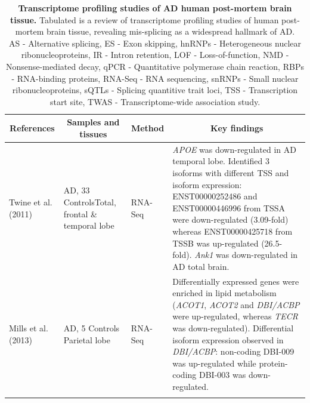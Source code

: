 \begin{landscape}
	\small %
	\setlength\tabcolsep{2pt} %
	\renewcommand{\arraystretch}{1}
	\begin{longtable}[c]{p{3cm}p{4cm}p{3cm}p{16cm}}
		\caption[Transcriptome profiling studies of AD human post-mortem brain tissue]%
		{\textbf{Transcriptome profiling studies of AD human post-mortem brain tissue.} Tabulated is a review of transcriptome profiling studies of human post-mortem brain tissue, revealing mis-splicing as a widespread hallmark of AD. \newline AS - Alternative splicing, ES - Exon skipping, hnRNPs - Heterogeneous nuclear ribonucleoproteins, IR - Intron retention, LOF - Loss-of-function, NMD - Nonsense-mediated decay, qPCR - Quantitative polymerase chain reaction, RBPs - RNA-binding proteins, RNA-Seq - RNA sequencing, snRNPs - Small nuclear ribonucleoproteins, sQTLs - Splicing quantitive trait loci, TSS - Transcription start site, TWAS - Transcriptome-wide association study.}
		\label{tab: AS_ADHuman_studies}\\
		
		\toprule
		\multicolumn{1}{c}{References} &
		\multicolumn{1}{c}{Samples and tissues} &
		\multicolumn{1}{c}{Method} &
		\multicolumn{1}{c}{Key findings} \\* \midrule
		\endfirsthead
		\endhead
		\bottomrule
		\endfoot
		\endlastfoot
		\centering Twine et al. (2011)\cite{Twine2011} &
		\centering 3 AD, 33 Controls\newline Total, frontal \& temporal lobe &
		\centering RNA-Seq &
		\tabitem \textit{APOE} was down-regulated in AD temporal lobe. Identified 3 isoforms with different TSS and isoform expression: ENST00000252486 and ENST00000446996 from TSSA were down-regulated (3.09-fold) whereas ENST00000425718 from TSSB was up-regulated (26.5-fold). \newline
		\tabitem \textit{Ank1} was down-regulated in AD total brain. \\
		\hdashline[0.5pt/5pt]
		
		\centering Mills et al. (2013)\cite{Mills2013} &
		\centering 5 AD, 5 Controls \newline Parietal lobe &
		\centering RNA-Seq &
		\tabitem Differentially expressed genes were enriched in lipid metabolism (\textit{ACOT1}, \textit{ACOT2} and \textit{DBI/ACBP} were up-regulated, whereas \textit{TECR} was down-regulated). \newline
		\tabitem Differential isoform expression observed in \textit{DBI/ACBP}: non-coding DBI-009 was up-regulated while protein-coding DBI-003 was down-regulated. \\
		\hdashline[0.5pt/5pt]
		

\end{longtable}
\end{landscape}
